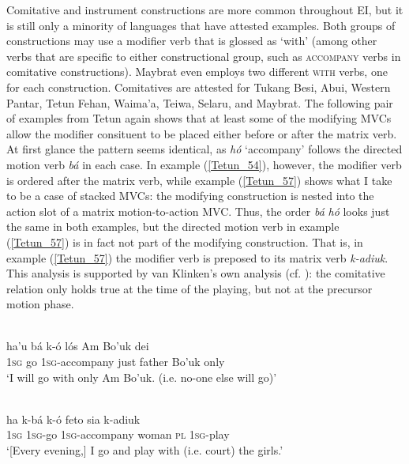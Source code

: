 Comitative and instrument constructions are more common throughout EI, but it is still only a minority of languages that have attested examples. Both groups of constructions may use a modifier verb that is glossed as `with' (among other verbs that are specific to either constructional group, such as \textsc{accompany} verbs in comitative constructions). Maybrat even employs two different \textsc{with} verbs, one for each construction. Comitatives are attested for Tukang Besi, Abui, Western Pantar, Tetun Fehan, Waima'a, Teiwa, Selaru, and Maybrat. The following pair of examples from Tetun again shows that at least some of the modifying MVCs allow the modifier consituent to be placed either before or after the matrix verb. At first glance the pattern seems identical, as \textit{hó} `accompany' follows the directed motion verb \textit{bá} in each case. In example (\ref{Tetun_54}), however, the modifier verb is ordered after the matrix verb, while example (\ref{Tetun_57}) shows what I take to be a case of stacked MVCs: the modifying construction is nested into the action slot of a matrix motion-to-action MVC. Thus, the order \textit{bá} \textit{hó} looks just the same in both examples, but the directed motion verb in example (\ref{Tetun_57}) is in fact not part of the modifying construction. That is, in example (\ref{Tetun_57}) the modifier verb is preposed to its matrix verb \textit{k-adiuk}. This analysis is supported by van Klinken's own analysis (cf. \citealt[272]{vanklinken1999grammar}): the comitative relation only holds true at the time of the playing, but not at the precursor motion phase.

\ea \label{Tetun_54}
\\
\gll ha'u bá k-ó lós Am Bo'uk dei \\
1\textsc{sg} go 1\textsc{sg}-accompany just father Bo'uk only \\
\glft `I will go with only Am Bo'uk. (i.e. no-one else will go)'\\ 
\z

\ea \label{Tetun_57}
\\
\gll ha k-bá k-ó feto sia k-adiuk \\
1\textsc{sg} 1\textsc{sg}-go 1\textsc{sg}-accompany woman \textsc{pl} 1\textsc{sg}-play \\
\glft `[Every evening,] I go and play with (i.e. court) the girls.'\\ 
\z

